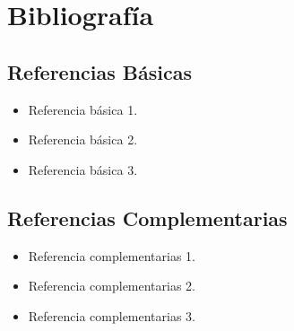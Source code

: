 \section{Bibliografía}

\subsection*{Referencias Básicas}

\begin{itemize}
    \item Referencia básica 1.
    \item Referencia básica 2.
    \item Referencia básica 3.
\end{itemize}

\subsection*{Referencias Complementarias}

\begin{itemize}
    \item Referencia complementarias 1.
    \item Referencia complementarias 2.
    \item Referencia complementarias 3.
\end{itemize}

\pagebreak